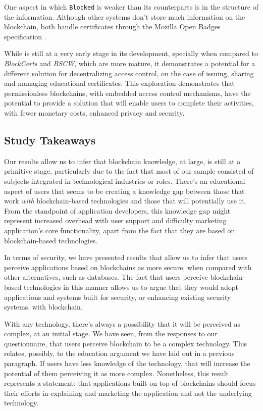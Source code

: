 One aspect in which \texttt{Blocked} is weaker than its counterparts is in the structure of the information. Although other systems don't store much information on the blockchain, both handle certificates through the Mozilla Open Badges specification \cite{openbadges}.

While  is still at a very early stage in its development, specially when compared to \emph{BlockCerts} and \emph{BSCW}, which are more mature, it demonstrates a potential for a different solution for decentralizing access control, on the case of issuing, sharing and managing educational certificates. This exploration demonstrates that permissionless blockchains, with embedded access control mechanisms, have the potential to provide a solution that will enable users to complete their activities, with fewer monetary costs, enhanced privacy and security.

\subsection{Study Takeaways}
\label{sec:eval-study}

Our results allow us to infer that blockchain knowledge, at large, is still at a primitive stage, particularly due to the fact that most of our sample consisted of subjects integrated in technological industries or roles. There's an educational aspect of users that seems to be creating a knowledge gap between those that work \emph{with} blockchain-based technologies and those that will potentially use it. From the standpoint of application developers, this knowledge gap might represent increased overhead with user support and difficulty marketing application's core functionality, apart from the fact that they are based on blockchain-based technologies.

In terms of security, we have presented results that allow us to infer that users perceive applications based on blockchains as more secure, when compared with other alternatives, such as databases. The fact that users perceive blockchain-based technologies in this manner allows us to argue that they would adopt applications and systems built for security, or enhancing existing security systems, with blockchain. 

With any technology, there's always a possibility that it will be perceived as complex, at an initial stage. We have seen, from the responses to our questionnaire, that users perceive blockchain to be a complex technology. This relates, possibly, to the education argument we have laid out in a previous paragraph. If users have less knowledge of the technology, that will increase the potential of them perceiving it as more complex. Nonetheless, this result represents a statement: that applications built on top of blockchains should focus their efforts in explaining and marketing the application and not the underlying technology.


